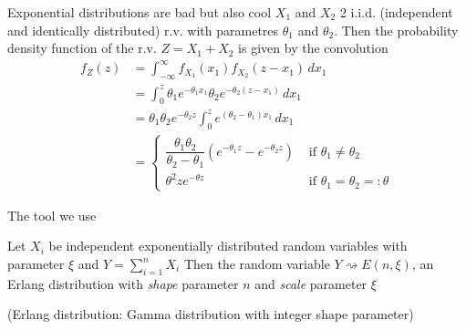\documentclass[aspectratio=169]{beamer}\usepackage[]{graphicx}\usepackage[]{xcolor}
\begin{document}
\begin{frame}{Exponential distributions are bad but also cool}
$X_1$ and $X_2$ 2 i.i.d. (independent and identically distributed) r.v. with parametres $\theta_1$ and $\theta_2$. Then the probability density function of the r.v. $Z=X_1+X_2$ is given by the convolution
\begin{align}
 f_Z(z) &= \int_{-\infty}^\infty f_{X_1}(x_1) f_{X_2}(z - x_1)\,dx_1 \nonumber\\
   &= \int_0^z \theta_1 e^{-\theta_1 x_1} \theta_2 e^{-\theta_2(z - x_1)} \, dx_1 \nonumber\\
   &= \theta_1 \theta_2 e^{-\theta_2 z} \int_0^z e^{(\theta_2 - \theta_1)x_1}\,dx_1 \nonumber\\
   &= \begin{cases}
        \dfrac{\theta_1 \theta_2}{\theta_2-\theta_1} \left(e^{-\theta_1 z} - e^{-\theta_2 z}\right) & \text{ if } \theta_1 \neq \theta_2 \\
        \theta^2 z e^{-\theta z} & \text{ if } \theta_1 = \theta_2 =: \theta
      \end{cases}
\end{align}
\end{frame}

\begin{frame}{The tool we use}
\begin{theorem}
Let $X_i$ be independent exponentially distributed random variables with parameter $\xi$ and $Y = \sum_{i=1}^n X_i$
\vskip1cm
Then the random variable $Y\rightsquigarrow E(n,\xi)$, an Erlang distribution with \emph{shape} parameter $n$ and \emph{scale} parameter $\xi$
\end{theorem}
\vfill
(Erlang distribution: Gamma distribution with integer shape parameter)
\end{frame}
\end{document}
